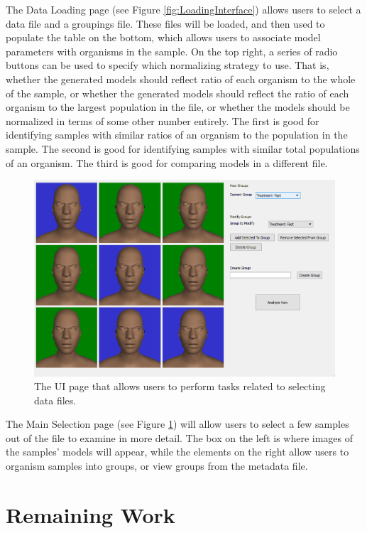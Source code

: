 \documentclass[letterpaper,10pt, onecolumn, draftclsnofoot]{IEEEtran}
\begin{document}
The Data Loading page (see Figure \ref{fig:LoadingInterface}) allows users to select a data file and a groupings file. These files will be loaded, and then used to populate the table on the bottom, which allows users to associate model parameters with organisms in the sample. On the top right, a series of radio buttons can be used to specify which normalizing strategy to use. That is, whether the generated models should reflect ratio of each organism to the whole of the sample, or whether the generated models should reflect the ratio of each organism to the largest population in the file, or whether the models should be normalized in terms of some other number entirely. The first is good for identifying samples with similar ratios of an organism to the population in the sample. The second is good for identifying samples with similar total populations of an organism. The third is good for comparing models in a different file.

\begin{figure}
	\includegraphics[width=\textwidth]{Comparison.PNG}
	\caption{The UI page that allows users to perform tasks related to selecting data files.}
	\label{fig:MainInterface}
\end{figure}

The Main Selection page (see Figure \ref{fig:MainInterface}) will allow users to select a few samples out of the file to examine in more detail. The box on the left is where images of the samples' models will appear, while the elements on the right allow users to organism samples into groups, or view groups from the metadata file.

\section{Remaining Work}\label{rWork}
\end{document}
